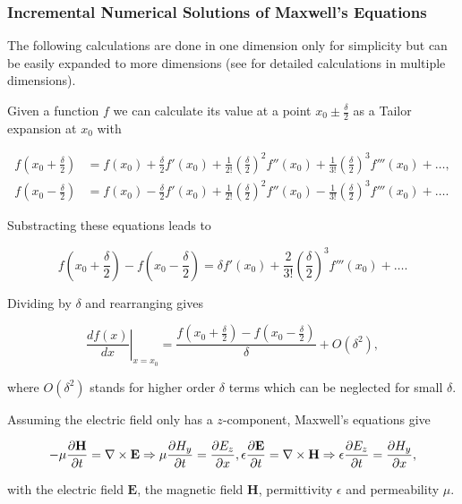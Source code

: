 \subsubsection{Incremental Numerical Solutions of Maxwell's Equations}

The following calculations are done in one dimension only for simplicity but can be easily expanded to more dimensions (see \cite{numel} for detailed calculations in multiple dimensions).

Given a function $f$ we can calculate its value at a point $x_0\pm\frac{\delta}{2}$ as a Tailor expansion at $x_0$ with

\begin{align}
  f\left(x_0+\frac{\delta}{2}\right)&=f(x_0)+\frac{\delta}{2}f'(x_0)+\frac{1}{2!}\left(\frac{\delta}{2}\right)^2f''(x_0)+\frac{1}{3!}\left(\frac{\delta}{2}\right)^3f'''(x_0)+\dots,\\
  f\left(x_0-\frac{\delta}{2}\right)&=f(x_0)-\frac{\delta}{2}f'(x_0)+\frac{1}{2!}\left(\frac{\delta}{2}\right)^2f''(x_0)-\frac{1}{3!}\left(\frac{\delta}{2}\right)^3f'''(x_0)+\dots.
\end{align}

Substracting these equations leads to

\begin{equation}
  f\left(x_0+\frac{\delta}{2}\right)-f\left(x_0-\frac{\delta}{2}\right)=\delta f'(x_0)+\frac{2}{3!}\left(\frac{\delta}{2}\right)^3f'''(x_0)+\dots.
\end{equation}

Dividing by $\delta$ and rearranging gives

\begin{equation}
  \left.\frac{df(x)}{dx}\right|_{x=x_0} = \frac{f(x_0+\frac{\delta}{2})-f(x_0-\frac{\delta}{2})}{\delta} + O(\delta^2),
\end{equation}

where $O(\delta^2)$ stands for higher order $\delta$ terms which can be neglected for small $\delta$.

Assuming the electric field only has a $z$-component, Maxwell's equations give

\begin{equation}
  -\mu\frac{\partial\mathbf{H}}{\partial t}=\nabla\times\mathbf{E} \Rightarrow \mu\frac{\partial H_y}{\partial t} = \frac{\partial E_z}{\partial x},\\ \label{maxwell}
  \epsilon\frac{\partial\mathbf{E}}{\partial t}=\nabla\times\mathbf{H} \Rightarrow \epsilon\frac{\partial E_z}{\partial t} = \frac{\partial H_y}{\partial x},
\end{equation}

with the electric field $\mathbf{E}$, the magnetic field $\mathbf{H}$, permittivity $\epsilon$ and permeability $\mu$.
